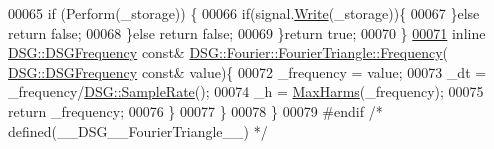 \begin{DoxyCode}
00065                 \textcolor{keywordflow}{if} (Perform(\_storage)) \{
00066                     \textcolor{keywordflow}{if}(signal.\hyperlink{class_d_s_g_1_1_ring_buffer_aa5dd2caa0a270173251faee40a43d692}{Write}(\_storage))\{
00067                     \}\textcolor{keywordflow}{else} \textcolor{keywordflow}{return} \textcolor{keyword}{false};
00068                 \}\textcolor{keywordflow}{else} \textcolor{keywordflow}{return} \textcolor{keyword}{false};
00069             \}\textcolor{keywordflow}{return} \textcolor{keyword}{true};
00070         \}
\hypertarget{_fourier_triangle_8h_source_l00071}{}\hyperlink{class_d_s_g_1_1_fourier_1_1_fourier_triangle_a278a51ed8af32ea371adc903b9b25039}{00071}         \textcolor{keyword}{inline} \hyperlink{namespace_d_s_g_a4315a061386fa1014fda09b15d3a6973}{DSG::DSGFrequency} \textcolor{keyword}{const}& 
      \hyperlink{class_d_s_g_1_1_phasor_a6bdec1d2722e2fa5c7173ac5f7adf682}{DSG::Fourier::FourierTriangle::Frequency}(
      \hyperlink{namespace_d_s_g_a4315a061386fa1014fda09b15d3a6973}{DSG::DSGFrequency} \textcolor{keyword}{const}& value)\{
00072             \_frequency = value;
00073             \_dt = \_frequency/\hyperlink{namespace_d_s_g_a72df05177db0412c3590070923f62819}{DSG::SampleRate}();
00074             \_h = \hyperlink{namespace_d_s_g_ab5c4eea42ea10b69cfc32afb83ff1d0d}{MaxHarms}(\_frequency);
00075             \textcolor{keywordflow}{return} \_frequency;
00076         \}
00077     \}
00078 \}
00079 \textcolor{preprocessor}{#endif }\textcolor{comment}{/* defined(\_\_DSG\_\_FourierTriangle\_\_) */}\textcolor{preprocessor}{}
\end{DoxyCode}
